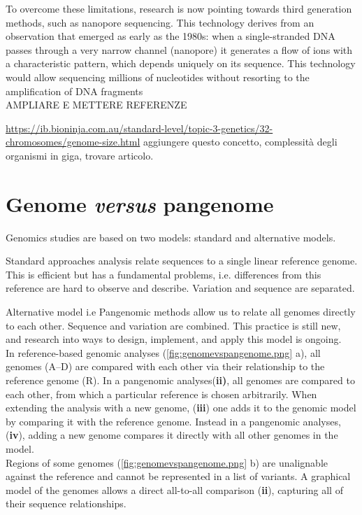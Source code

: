 To overcome these limitations, research is now pointing towards third generation methods, such as nanopore sequencing. This technology derives from an observation that emerged as early as the 1980s: when a single-stranded DNA passes through a very narrow channel (nanopore) it generates a flow of ions with a characteristic pattern, which depends uniquely on its sequence. This technology would allow sequencing millions of nucleotides without resorting to the amplification of DNA fragments\\

AMPLIARE E METTERE REFERENZE 

\url{https://ib.bioninja.com.au/standard-level/topic-3-genetics/32-chromosomes/genome-size.html}
aggiungere questo concetto, complessità degli organismi in giga, trovare articolo.

\section{Genome \textit{versus} pangenome}


Genomics studies are based on two models: standard and alternative models. 

Standard approaches analysis relate sequences to a single linear reference genome. This is efficient but has a fundamental problems, i.e. differences from this reference are hard to observe and describe. Variation and sequence are separated. 

Alternative model i.e Pangenomic methods allow us to relate all genomes directly to each other. Sequence and variation are combined. This practice is still new, and research into ways to design, implement, and apply this model is ongoing. \\

In reference-based genomic analyses (\ref{fig:genomevspangenome.png} a), all genomes (A–D) are compared with each other via their relationship to the reference genome (R).
In a pangenomic analyses(\textbf{ii)},  all genomes are compared to each other, from which a particular reference is chosen arbitrarily. 
When extending the analysis with a new genome, (\textbf{iii}) one adds it to the genomic model by comparing it with the reference genome.
Instead in a pangenomic analyses,(\textbf{iv}), adding a new genome compares it directly with all other genomes in the model.\\
 
Regions of some genomes (\ref{fig:genomevspangenome.png} b) are unalignable against the reference and cannot be represented in a list of variants. A graphical model of the genomes allows a direct all-to-all comparison (\textbf{ii}), capturing all of their sequence relationships.

